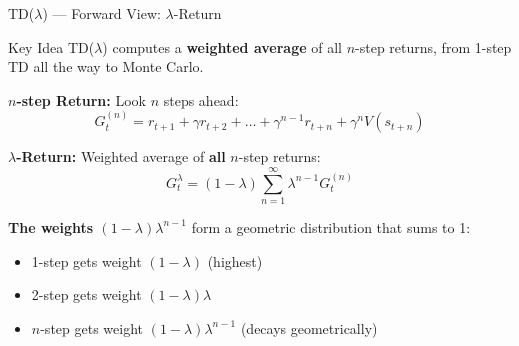 \documentclass[aspectratio=169]{beamer}
\begin{document}
\begin{frame}{TD($\lambda$) --- Forward View: $\lambda$-Return}
    \begin{block}{Key Idea}
        TD($\lambda$) computes a \textbf{weighted average} of all $n$-step returns, from 1-step TD all the way to Monte Carlo.
    \end{block}

    \vspace{0.2cm}

    \textbf{$n$-step Return:} Look $n$ steps ahead:
    \[G_t^{(n)} = r_{t+1} + \gamma r_{t+2} + \dots + \gamma^{n-1} r_{t+n} + \gamma^n V(s_{t+n})\]

    \textbf{$\lambda$-Return:} Weighted average of \textbf{all} $n$-step returns:
    \[G_t^\lambda = (1-\lambda) \sum_{n=1}^{\infty} \lambda^{n-1} G_t^{(n)}\]

    \textbf{The weights $(1-\lambda)\lambda^{n-1}$} form a geometric distribution that sums to 1:
    \begin{itemize}
        \item 1-step gets weight $(1-\lambda)$ \hfill (highest)
        \item 2-step gets weight $(1-\lambda)\lambda$
        \item $n$-step gets weight $(1-\lambda)\lambda^{n-1}$ \hfill (decays geometrically)
    \end{itemize}
\end{frame}
\end{document}
